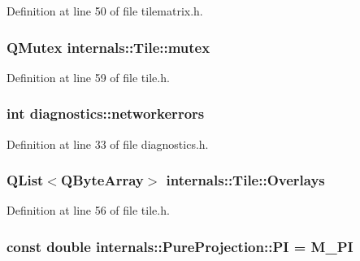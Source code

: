 \-Definition at line 50 of file tilematrix.\-h.

\hypertarget{group___o_p_map_widget_gadfb1115a74bee691ed9d70c97b727ef7}{
\subsubsection[{mutex}]{\setlength{\rightskip}{0pt plus 5cm}\-Q\-Mutex {\bf internals\-::\-Tile\-::mutex}}}\label{group___o_p_map_widget_gadfb1115a74bee691ed9d70c97b727ef7}


\-Definition at line 59 of file tile.\-h.

\hypertarget{group___o_p_map_widget_ga818b2b21d317fac5193b04d2c0e32c82}{
\subsubsection[{networkerrors}]{\setlength{\rightskip}{0pt plus 5cm}int {\bf diagnostics\-::networkerrors}}}\label{group___o_p_map_widget_ga818b2b21d317fac5193b04d2c0e32c82}


\-Definition at line 33 of file diagnostics.\-h.

\hypertarget{group___o_p_map_widget_ga45369aa8480e3bd7ff5c6a6017573361}{
\subsubsection[{\-Overlays}]{\setlength{\rightskip}{0pt plus 5cm}\-Q\-List$<$\-Q\-Byte\-Array$>$ {\bf internals\-::\-Tile\-::\-Overlays}}}\label{group___o_p_map_widget_ga45369aa8480e3bd7ff5c6a6017573361}


\-Definition at line 56 of file tile.\-h.

\hypertarget{group___o_p_map_widget_gaab58a4dd2b2aec1a140df479c3da07c5}{
\subsubsection[{\-P\-I}]{\setlength{\rightskip}{0pt plus 5cm}const double {\bf internals\-::\-Pure\-Projection\-::\-P\-I} = \-M\-\_\-\-P\-I}}\label{group___o_p_map_widget_gaab58a4dd2b2aec1a140df479c3da07c5}


